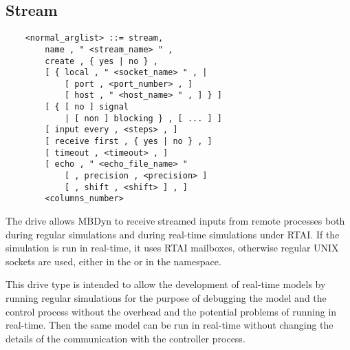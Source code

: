 \subsection{Stream}\label{sec:Stream}
\begin{verbatim}
    <normal_arglist> ::= stream,
        name , " <stream_name> " ,
        create , { yes | no } ,
        [ { local , " <socket_name> " , |
            [ port , <port_number> , ]
            [ host , " <host_name> " , ] } ]
        [ { [ no ] signal
            | [ non ] blocking } , [ ... ] ]
        [ input every , <steps> , ]
        [ receive first , { yes | no } , ]
        [ timeout , <timeout> , ]
        [ echo , " <echo_file_name> "
            [ , precision , <precision> ]
            [ , shift , <shift> ] , ]
        <columns_number>
\end{verbatim}
The  drive allows MBDyn to receive streamed inputs 
from remote processes both during regular simulations and during 
real-time simulations under RTAI.
If the simulation is run in real-time, it uses RTAI mailboxes, 
otherwise regular UNIX sockets are used, either in the  or 
in the  namespace.

This drive type is intended to allow the development of real-time models
by running regular simulations for the purpose of debugging the model
and the control process without the overhead and the potential problems
of running in real-time.
Then the same model can be run in real-time without changing the details
of the communication with the controller process.

